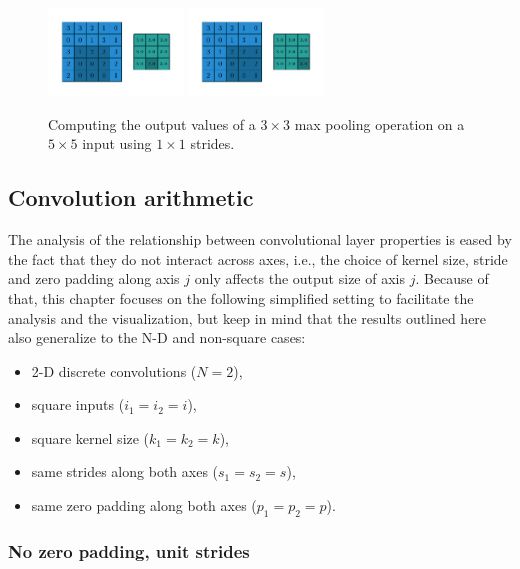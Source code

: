 \begin{figure}[p]
    \includegraphics[width=0.32\textwidth]{pdf/numerical_max_pooling_07.pdf}
    \includegraphics[width=0.32\textwidth]{pdf/numerical_max_pooling_08.pdf}
    \caption{\label{fig:numerical_max_pooling} Computing the output values of a
        $3 \times 3$ max pooling operation on a $5 \times 5$ input using $1
        \times 1$ strides.}
\end{figure}

\subsection{Convolution arithmetic}

The analysis of the relationship between convolutional layer properties is
eased by the fact that they do not interact across axes, i.e., the choice of
kernel size, stride and zero padding along axis $j$ only affects the output
size of axis $j$. Because of that, this chapter focuses on the following
simplified setting to facilitate the analysis and the visualization, but keep
in mind that the results outlined here also generalize to the N-D and
non-square cases:

\begin{itemize}
    \item 2-D discrete convolutions ($N = 2$),
    \item square inputs ($i_1 = i_2 = i$),
    \item square kernel size ($k_1 = k_2 = k$),
    \item same strides along both axes ($s_1 = s_2 = s$),
    \item same zero padding along both axes ($p_1 = p_2 = p$).
\end{itemize}


\subsubsection{No zero padding, unit strides}

